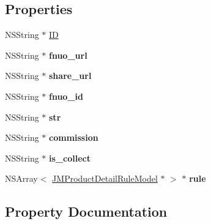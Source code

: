 \subsection*{Properties}
\begin{DoxyCompactItemize}
\item 
N\+S\+String $\ast$ \mbox{\hyperlink{interface_j_m_product_detail_model_afde5c47d6ae40f67452e34e0582339eb}{ID}}
\item 
\mbox{\label{interface_j_m_product_detail_model_ad5c6f8fe03708bd413ed7c921809e3ba}} 
N\+S\+String $\ast$ {\bfseries fnuo\+\_\+url}
\item 
\mbox{\label{interface_j_m_product_detail_model_a62d22713a856621dcc22eab85b6cdc5b}} 
N\+S\+String $\ast$ {\bfseries share\+\_\+url}
\item 
\mbox{\label{interface_j_m_product_detail_model_ae4a3499e0d6e12c2747bc371f28146ad}} 
N\+S\+String $\ast$ {\bfseries fnuo\+\_\+id}
\item 
\mbox{\label{interface_j_m_product_detail_model_acf5d0480a357d7f2bd23f096c27602ea}} 
N\+S\+String $\ast$ {\bfseries str}
\item 
\mbox{\label{interface_j_m_product_detail_model_ae6cfe72fa5ffb83e20095ea8857a4f3d}} 
N\+S\+String $\ast$ {\bfseries commission}
\item 
\mbox{\label{interface_j_m_product_detail_model_afa15325b77ee7aee660078d263dec6fa}} 
N\+S\+String $\ast$ {\bfseries is\+\_\+collect}
\item 
\mbox{\label{interface_j_m_product_detail_model_a0bd1ecfd8fb4d6223e8fd9243189862a}} 
N\+S\+Array$<$ \mbox{\hyperlink{interface_j_m_product_detail_rule_model}{J\+M\+Product\+Detail\+Rule\+Model}} $\ast$ $>$ $\ast$ {\bfseries rule}
\end{DoxyCompactItemize}


\subsection{Property Documentation}
\mbox{\label{interface_j_m_product_detail_model_afde5c47d6ae40f67452e34e0582339eb}} 
